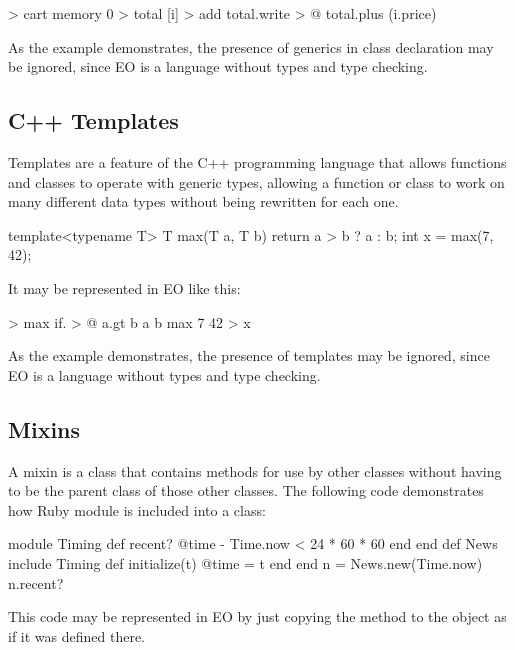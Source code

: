\documentclass[sigplan,11pt,nonacm,natbib=false]{acmart}
\begin{document}
\begin{ffcode}
[] > cart
  memory 0 > total
  [i] > add
    total.write > @
      total.plus (i.price)
\end{ffcode}

As the example demonstrates, the presence of generics in class declaration may be ignored, since EO is a language without types and type checking.

\subsection{C++ Templates}
\label{sec:templates}

Templates are a feature of the C++ programming language that allows functions and classes to operate with generic types, allowing a function or class to work on many different data types without being rewritten for each one.

\begin{ffcode}
template<typename T> T max(T a, T b) { 
  return a > b ? a : b; 
}
int x = max(7, 42);
\end{ffcode}

It may be represented in EO like this:

\begin{ffcode}
[a b] > max
  if. > @
    a.gt b
    a
    b
max 7 42 > x
\end{ffcode}

As the example demonstrates, the presence of templates may be ignored, since EO is a language without types and type checking.

\subsection{Mixins}
\label{sec:mixins}

A mixin is a class that contains methods for use by other classes without having to be the parent class of those other classes. The following code demonstrates how Ruby module is included into a class:

\begin{ffcode}
module Timing
  def recent?
    @time - Time.now < 24 * 60 * 60
  end
end
def News
  include Timing
  def initialize(t)
    @time = t
  end
end
n = News.new(Time.now)
n.recent?
\end{ffcode}

This code may be represented in EO by just copying the method  to the object  as if it was defined there.
\end{document}
